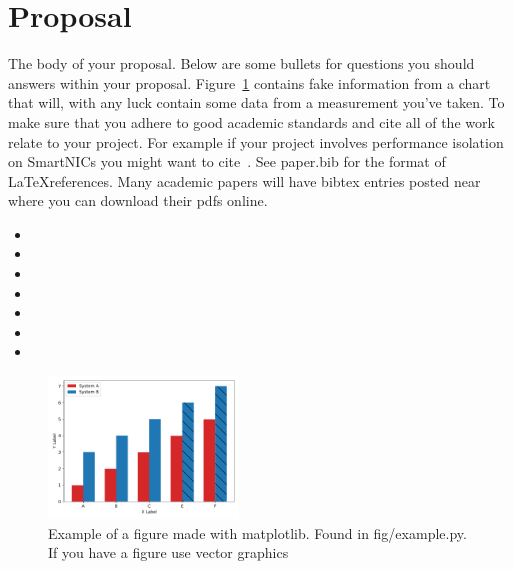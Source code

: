 \section{Proposal}

The body of your proposal. Below are some bullets for questions you should
answers within your proposal. Figure~\ref{fig:example} contains fake information
from a chart that will, with any luck contain some data from a measurement
you've taken. To make sure that you adhere to good academic standards and cite all
of the work relate to your project. For example if your project involves
performance isolation on SmartNICs you might want to cite~\cite{fairnic}. See
paper.bib for the format of \LaTeX references. Many academic papers will have
bibtex entries posted near where you can download their pdfs online.


\begin{itemize}
    \item{}
    \item{}
    \item{}
    \item{}
    \item{}
    \item{}
    \item{}
\end{itemize}

\begin{figure}[H]
    \includegraphics[width=0.45\textwidth]{fig/example.pdf}
    \caption{Example of a figure made with matplotlib. Found in fig/example.py. If you have a figure use vector graphics}
    \label{fig:example}
    \vspace*{-13.00mm}
\end{figure}

